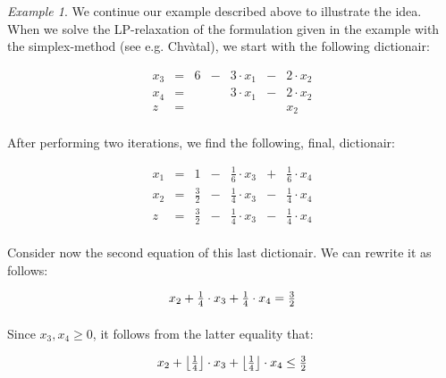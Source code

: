 \documentclass[titlepage]{book}
\theoremstyle{plain}
\theoremstyle{definition}
\theoremstyle{remark}
\newtheorem{example}{Example}
\begin{document}
\begin{example}
We continue our example described above to illustrate the idea. When we solve the LP-relaxation of the formulation given in the example with the simplex-method (see e.g. Chv\`atal\cite{Chvatal/83/Linear}), we start with the following dictionair:

\begin{equation}
\begin{array}{rcrcrcr}
x_3&=&6&-&3\cdot x_1&-&2\cdot x_2\\
x_4&=&&&3\cdot x_1&-&2\cdot x_2\\\hline
z&=&&&&&x_2
\end{array}
\end{equation}

\paragraph{}
After performing two iterations, we find the following, final, dictionair:

\begin{equation}
\begin{array}{rcrcrcr}
x_1&=&1&-&\tfrac{1}{6}\cdot x_3&+&\tfrac{1}{6}\cdot x_4\\
x_2&=&\tfrac{3}{2}&-&\tfrac{1}{4}\cdot x_3&-&\tfrac{1}{4}\cdot x_4\\\hline
z&=&\tfrac{3}{2}&-&\tfrac{1}{4}\cdot x_3&-&\tfrac{1}{4}\cdot x_4
\end{array}
\end{equation}

\paragraph{}
Consider now the second equation of this last dictionair. We can rewrite it as follows:

\begin{equation}
x_2+\tfrac{1}{4}\cdot x_3+\tfrac{1}{4}\cdot x_4=\tfrac{3}{2}\eqnlab{cg-cut-eq2-ini}
\end{equation}

\paragraph{}
Since $x_3,x_4\geq 0$, it follows from the latter equality that:

\begin{equation}
x_2+\left\lfloor \tfrac{1}{4} \right\rfloor\cdot x_3+\left\lfloor \tfrac{1}{4} \right\rfloor\cdot x_4\leq\tfrac{3}{2}
\end{equation}


\end{example}
\end{document}
